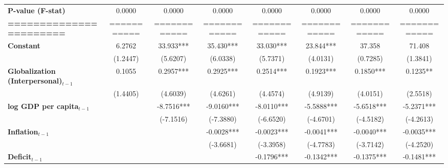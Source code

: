 \begin{center}
\begin{tabular}{lccccccc}
\textbf{P-value (F-stat)}          &       0.0000      &        0.0000        &           0.0000          &       0.0000       &      0.0000     &           0.0000          &            0.0000             \\
\textbf{=======================}   &    ===========    &     ============     &        ============       &    ============    &   ============  &        ============       &         ============          \\
\textbf{Constant}                     &       6.2762      &      33.933***       &         35.430***         &     33.030***      &    23.844***    &           37.358          &            71.408             \\
\textbf{ }                         &      (1.2447)     &       (5.6207)       &          (6.0338)         &      (5.7371)      &     (4.0131)    &          (0.7285)         &           (1.3841)            \\
\textbf{Globalization (Interpersonal)$_{t-1}$}             &       0.1055      &      0.2957***       &         0.2925***         &     0.2514***      &    0.1923***    &         0.1850***         &           0.1235**            \\
\textbf{ }                         &      (1.4405)     &       (4.6039)       &          (4.6261)         &      (4.4574)      &     (4.9139)    &          (4.0151)         &           (2.5518)            \\
\textbf{log GDP per capita$_{t-1}$}           &                   &      -8.7516***      &         -9.0160***        &     -8.0110***     &    -5.5888***   &         -5.6518***        &          -5.2371***           \\
\textbf{ }                         &                   &      (-7.1516)       &         (-7.3880)         &     (-6.6520)      &    (-4.6701)    &         (-4.5182)         &          (-4.2613)            \\
\textbf{Inflation$_{t-1}$}      &                   &                      &         -0.0028***        &     -0.0023***     &    -0.0041***   &         -0.0040***        &          -0.0035***           \\
\textbf{ }                         &                   &                      &         (-3.6681)         &     (-3.3958)      &    (-4.7783)    &         (-3.7142)         &          (-4.2520)            \\
\textbf{Deficit$_{t-1}$}             &                   &                      &                           &     -0.1796***     &    -0.1342***   &         -0.1375***        &          -0.1481***           \\

\end{tabular}
\end{center}
